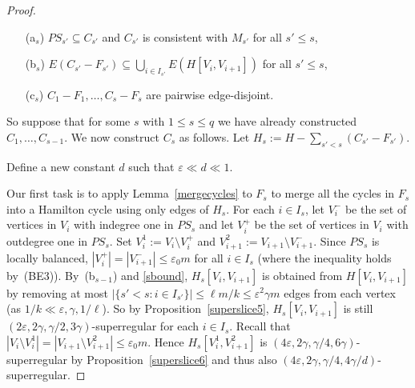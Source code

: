 \documentclass{memo-l}
\def\COMMENT#1{}
\def\eps{\varepsilon}
\numberwithin{section}{chapter}
\numberwithin{equation}{section}
\numberwithin{firstthm}{section}
\numberwithin{figure}{section}
\begin{document}
{\begin{proof}
\begin{itemize}
	\item[\rm(a$_s$)] $PS_{s'}\subseteq C_{s'}$ and $C_{s'}$ is consistent with $M_{s'}$ for all $s' \le s$,%
   \COMMENT{Daniela: added $PS_{s'}\subseteq C_{s'}$}
	\item[\rm(b$_s$)] $E(C_{s'} - F_{s'}) \subseteq \bigcup_{i \in I_{s'}} E(H[V_i,V_{i+1}])  $ for all $s' \le s$,
	\item[\rm(c$_s$)] $C_1 - F_1, \dots, C_{s}-F_s$ are pairwise edge-disjoint.%
	\COMMENT{Allan: had $C_1, \dots, C_s$}
\end{itemize}
So suppose that for some $s$ with $1\le s\le q$ we have already constructed $C_1, \dots, C_{s-1}$. We now construct $C_s$ as follows. 
Let $H_s:=H - \sum_{s' < s}(C_{s'} -F_{s'})$.%
	\COMMENT{Allan: had $H_s:=H-(C_1+\dots+C_{s-1})$}
Define a new constant $d$ such that $\eps \ll d \ll 1$.

Our first task is to apply Lemma~\ref{mergecycles} to $F_s$ to merge all the cycles in $F_s$ into a Hamilton cycle using only edges of $H_s$.
For each $i \in I_s$, let $V_i^{-}$  be the set of vertices in $V_i$ with indegree one in $PS_s$
and let $V_i^{+}$  be the set of vertices in $V_i$ with outdegree one in $PS_s$.
Set $V_i^1 := V_i \setminus V_i^{+}$ and $V_{i+1}^2 := V_{i+1} \setminus V_{i+1}^{-}$.
Since $PS_s$ is locally balanced, $|V_i^{+}| = |V_{i+1}^{-}| \le \eps_0 m $ for all $i \in I_s$ (where the inequality holds by~(BE3)).
By~(b$_{s-1}$) and \eqref{sbound}, $H_s[V_i,V_{i+1}]$ is obtained from $H[V_i,V_{i+1}]$ by removing at most
$|\{s' <s : i \in I_{s'}\}| \le \ell m /k \le \eps^2\gamma m$ edges from each vertex (as $1/k \ll \eps,\gamma, 1/\ell$).
So by Proposition~\ref{superslice5}, $H_s [V_i, V_{i+1}]$ is still $(2\eps,2\gamma ,\gamma/2 , 3 \gamma)$-superregular for each $i \in I_s$.
Recall that $|V_i \setminus V_i^1| = |V_{i+1} \setminus V_{i+1}^2| \le \eps_0 m$.
Hence $H_s [V_i^1, V_{i+1}^2]$ is $(4\eps,2\gamma ,\gamma/4 , 6 \gamma)$-superregular by Proposition~\ref{superslice6}
and thus also $(4\eps,2\gamma ,\gamma/4 , 4\gamma/d)$-superregular.


\end{proof}}
\end{document}
